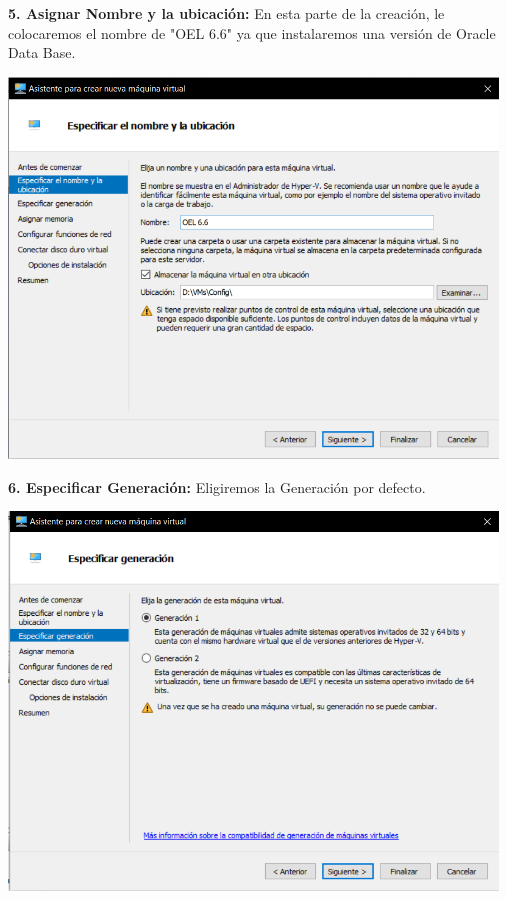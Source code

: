\begin{enumerate}
\textbf {5. Asignar Nombre y la ubicación:} En esta parte de la creación, le colocaremos el nombre de "OEL 6.6" ya que instalaremos una versión de Oracle Data Base.
\begin{center}
  \includegraphics[width=13cm]{Imagenes/Especificar_Nombre.png}
\end{center}
\break

\textbf {6. Especificar Generación:} Eligiremos la Generación por defecto. 
\begin{center}
  \includegraphics[width=13cm]{Imagenes/Especificar_Generacion.png}
\end{center}
\vspace{12pt}\\


\end{enumerate}
